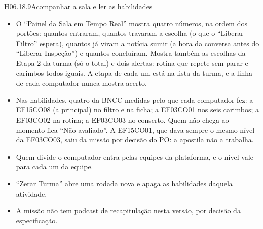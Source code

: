 \begin{historia}{H06.18.9}{Acompanhar a sala e ler as habilidades}{\pronto}
\aceite
\begin{itemize}
  \item O \enquote{Painel da Sala em Tempo Real} mostra quatro números, na
    ordem dos portões: quantos entraram, quantos travaram a escolha (o que o
    \enquote{Liberar Filtro} espera), quantos já viram a notícia sumir (a hora
    da conversa antes do \enquote{Liberar Inspeção}) e quantos concluíram.
    Mostra também as escolhas da Etapa 2 da turma (só o total) e dois alertas:
    rotina que repete sem parar e carimbos todos iguais. A etapa de cada um
    está na lista da turma, e a linha de cada computador nunca mostra acerto.
  \item Nas habilidades, quatro da BNCC medidas pelo que cada computador fez: a
    EF15CO08 (a principal) no filtro e na ficha; a EF03CO01 nos seis carimbos;
    a EF03CO02 na rotina; a EF03CO03 no conserto. Quem não chega ao momento
    fica \enquote{Não avaliado}. A EF15CO01, que dava sempre o mesmo nível da
    EF03CO03, saiu da missão por decisão do PO: a apostila não a trabalha.
  \item Quem divide o computador entra pelas equipes da plataforma, e o nível
    vale para cada um da equipe.
  \item \enquote{Zerar Turma} abre uma rodada nova e apaga as habilidades
    daquela atividade.
  \item A missão não tem podcast de recapitulação nesta versão, por decisão
    da especificação.
\end{itemize}
\end{historia}

